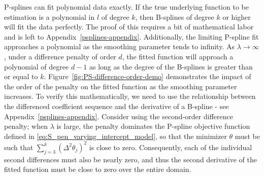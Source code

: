 P-splines can fit polynomial data exactly. If the true underlying function to be estimation is a polynomial in $l$ of degree $k$, then B-splines of degree $k$ or higher will fit the data perfectly. The proof of this requires a bit of mathematical labor and is left to Appendix~\ref{psplines-appendix}. Additionally, the limiting P-spline fit approaches a polynomial as the smoothing parameter tends to infinity.  As $\lambda \rightarrow \infty$, under a difference penalty of order $d$, the fitted function will approach a polynomial of degree $d-1$ as long as the degree of the B-splines is greater than or equal to $k$. Figure~\ref{fig:PS-difference-order-demo} demonstrates the impact of the order of the penalty on the fitted function as the smoothing parameter increases. To verify this mathematically, we need to use the relationship between the differenced coefficient sequence and the derivative of a B-spline - see Appendix~\ref{psplines-appendix}. Consider using the second-order difference penalty; when $\lambda$ is large, the penalty dominates the P-spline objective function defined in \ref{eq:S_pen_varying_intercept_model}, so that the minimizer $\theta$ must be such that $\sum_{j=3}^k\left(\Delta^2\theta_j\right)^2$ is close to zero. Consequently, each of the individual second differences must also be nearly zero, and thus the second derivative of the fitted function must be close to zero over the entire domain.

